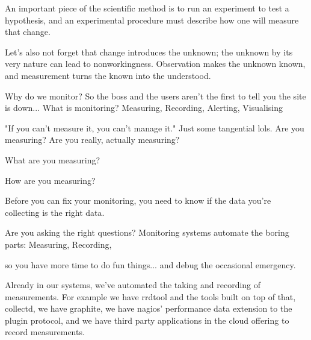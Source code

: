 \documentclass[online,12pt,helvetica]{chaksem}
\begin{document}
An important piece of the scientific method is to run an experiment to test a
hypothesis, and an experimental procedure must describe how one will measure
that change.

Let's also not forget that change introduces the unknown; the unknown by its
very nature can lead to nonworkingness.  Observation makes the unknown known,
and measurement turns the known into the understood.


Why do we monitor?
So the boss and the users aren't the first to tell you the site is down...
What is monitoring?
Measuring,
Recording,
Alerting,
Visualising

"If you can't measure it, you can't manage it."
Just some tangential lols.
Are you measuring?
Are you really, actually measuring?

What are you measuring?

How are you measuring?


Before you can fix your monitoring, you need to know if the data you're collecting is the right data.

Are you asking the right questions?
Monitoring systems
automate the boring parts:
Measuring,
Recording,

so you have more time to do fun things... and debug the occasional emergency.

Already in our systems, we've automated the taking and recording of
measurements.  For example we have rrdtool and the tools built on top of that,
collectd, we have graphite, we have nagios' performance data extension to the
plugin protocol, and we have third party applications in the cloud offering to record
measurements.
\end{document}
